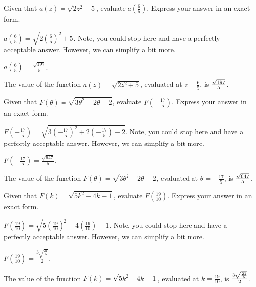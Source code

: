 \begin{shuffle} %
\begin{exercise}
Given that $a(z)=\sqrt{2 z^2+5}$, evaluate $a\left(\frac{6}{5}\right)$. Express your answer in an exact form.
\begin{solution}
\begin{hint}
$a\left(\frac{6}{5}\right)=\sqrt{2 (\frac{6}{5})^2+5}$. Note, you could stop here and have a perfectly acceptable answer. However, we can simplify a bit more. 
\end{hint}
\begin{hint}
$a\left(\frac{6}{5}\right)=\frac{\sqrt{197}}{5}$.
\end{hint}
The value of the function $a(z)=\sqrt{2 z^2+5}$, evaluated at $z=\frac{6}{5}$, is ${\frac{\sqrt{197}}{5}}$.
\end{solution}
\end{exercise}

\begin{exercise}
Given that $F(\theta)=\sqrt{3 \theta ^2+2 \theta -2}$, evaluate $F\left(-\frac{17}{5}\right)$. Express your answer in an exact form.
\begin{solution}
\begin{hint}
$F\left(-\frac{17}{5}\right)=\sqrt{3 (-\frac{17}{5})^2+2 (-\frac{17}{5})-2}$. Note, you could stop here and have a perfectly acceptable answer. However, we can simplify a bit more. 
\end{hint}
\begin{hint}
$F\left(-\frac{17}{5}\right)=\frac{\sqrt{647}}{5}$.
\end{hint}
The value of the function $F(\theta)=\sqrt{3 \theta ^2+2 \theta -2}$, evaluated at $\theta=-\frac{17}{5}$, is ${\frac{\sqrt{647}}{5}}$.
\end{solution}
\end{exercise}

\begin{exercise}
Given that $F(k)=\sqrt{5 k^2-4 k-1}$, evaluate $F\left(\frac{19}{10}\right)$. Express your answer in an exact form.
\begin{solution}
\begin{hint}
$F\left(\frac{19}{10}\right)=\sqrt{5 (\frac{19}{10})^2-4 (\frac{19}{10})-1}$. Note, you could stop here and have a perfectly acceptable answer. However, we can simplify a bit more. 
\end{hint}
\begin{hint}
$F\left(\frac{19}{10}\right)=\frac{3 \sqrt{\frac{21}{5}}}{2}$.
\end{hint}
The value of the function $F(k)=\sqrt{5 k^2-4 k-1}$, evaluated at $k=\frac{19}{10}$, is ${\frac{3 \sqrt{\frac{21}{5}}}{2}}$.
\end{solution}
\end{exercise}


\end{shuffle}

